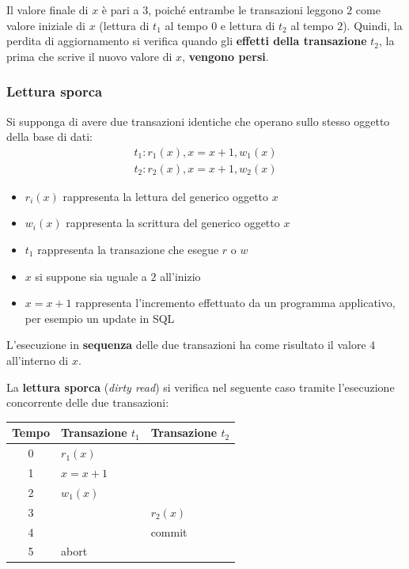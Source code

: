 \documentclass[a4paper]{article}
\begin{document}
	\noindent
	Il valore finale di $x$ è pari a $3$, poiché entrambe le transazioni leggono $2$ come valore iniziale di $x$ (lettura di $t_{1}$ al tempo $0$ e lettura di $t_{2}$ al tempo $2$). Quindi, la perdita di aggiornamento si verifica quando gli \textbf{effetti della transazione} $t_{2}$, la prima che scrive il nuovo valore di $x$, \textbf{vengono persi}.\newpage
	
	\subsubsection{Lettura sporca}\label{lettura sporca}
	
	Si supponga di avere due transazioni identiche che operano sullo stesso oggetto della base di dati:
	\begin{gather*}
		t_{1} : r_{1}\left(x\right), x = x + 1, w_{1}\left(x\right) \\
		t_{2} : r_{2}\left(x\right), x = x + 1, w_{2}\left(x\right)
	\end{gather*}
	\begin{itemize}
		\item $r_{i}\left(x\right)$ rappresenta la lettura del generico oggetto $x$
		\item $w_{i}\left(x\right)$ rappresenta la scrittura del generico oggetto $x$
		\item $t_{1}$ rappresenta la transazione che esegue $r$ o $w$
		\item $x$ si suppone sia uguale a $2$ all'inizio
		\item $x = x+1$ rappresenta l'incremento effettuato da un programma applicativo, per esempio un \textsf{update} in SQL
	\end{itemize}
	L'esecuzione in \textbf{sequenza} delle due transazioni ha come risultato il valore $4$ all'interno di $x$.\newline
	
	\noindent
	La \textcolor{Red3}{\textbf{lettura sporca}} (\emph{dirty read}) si verifica nel seguente caso tramite l'esecuzione concorrente delle due transazioni:
	\begin{table}[!htbp]
		\centering
		\begin{tabular}{@{} c l l @{}}
			\toprule
			Tempo & Transazione $t_{1}$ & Transazione $t_{2}$ \\
			\midrule
			0	& $r_{1}\left(x\right)$			& \\
			1	& $x = x + 1$					& \\
			2	& $w_{1}\left(x\right)$			& \\
			3	&								& $r_{2}\left(x\right)$ \\
			4	&								& \textsf{commit} \\
			5	& \textsf{abort}				& \\
			\bottomrule
		\end{tabular}
	\end{table}
	
\end{document}
